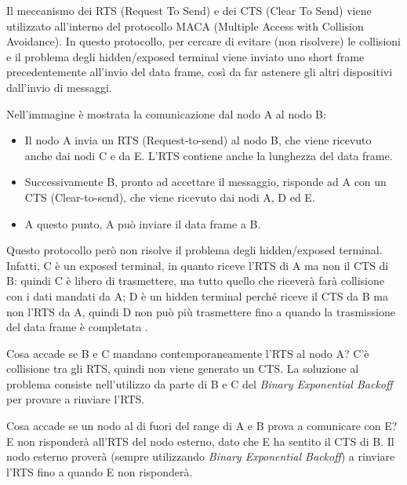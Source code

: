 Il meccanismo dei RTS (Request To Send) e dei CTS (Clear To Send) viene utilizzato all'interno del protocollo MACA (Multiple Access with Collision Avoidance). In questo protocollo, per cercare di evitare (non risolvere) le collisioni e il problema degli hidden/exposed terminal viene inviato uno short frame precedentemente all'invio del data frame, così da far astenere gli altri dispositivi dall'invio di messaggi.

Nell'immagine è mostrata la comunicazione dal nodo A al nodo B:
\begin{itemize}
    \item Il nodo A invia un RTS (Request-to-send) al nodo B, che viene ricevuto anche dai nodi C e da E. L'RTS contiene anche la lunghezza del data frame.
    \item Successivamente B, pronto ad accettare il messaggio, risponde ad A con un CTS (Clear-to-send), che viene ricevuto dai nodi A, D ed E.
    \item A questo punto, A può inviare il data frame a B.
\end{itemize}
Questo protocollo però non risolve il problema degli hidden/exposed terminal. Infatti, C è un exposed terminal, in quanto riceve l'RTS di A ma non il CTS di B: quindi C è libero di trasmettere, ma tutto quello che riceverà farà collisione con i dati mandati da A; D è un hidden terminal perché riceve il CTS da B ma non l'RTS da A, quindi D non può più trasmettere fino a quando la trasmissione del data frame è completata .

Cosa accade se B e C mandano contemporaneamente l'RTS al nodo A? C'è collisione tra gli RTS, quindi non viene generato un CTS. La soluzione al problema consiste nell'utilizzo da parte di B e C del \textit{Binary Exponential Backoff} per provare a rinviare l'RTS.

Cosa accade se un nodo al di fuori del range di A e B prova a comunicare con E? E non risponderà all'RTS del nodo esterno, dato che E ha sentito il CTS di B. Il nodo esterno proverà (sempre utilizzando \textit{Binary Exponential Backoff}) a rinviare l'RTS fino a quando E non risponderà.


